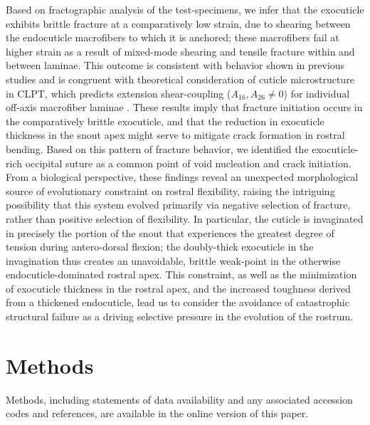 \documentclass[twocolumn, linenumbers, superscriptaddress, nofootinbib]{revtex4-1}
\begin{document}
		Based on fractographic analysis of the test-specimens, we infer that the exocuticle exhibits brittle fracture at a comparatively low strain, due to shearing between the endocuticle macrofibers to which it is anchored; these macrofibers fail at higher strain as a result of mixed-mode shearing and tensile fracture within and between laminae.
		This outcome is consistent with behavior shown in previous studies and is congruent with theoretical consideration of cuticle microstructure in CLPT, which predicts extension shear-coupling ($A_{16}, A_{26}\neq{0}$) for individual off-axis macrofiber laminae \cite{Jones2014, Reddy2004}.
		These results imply that fracture initiation occurs in the comparatively brittle exocuticle, and that the reduction in exocuticle thickness in the snout apex might serve to mitigate crack formation in rostral bending.
		Based on this pattern of fracture behavior, we identified the exocuticle-rich occipital suture as a common point of void nucleation and crack initiation.
		From a biological perspective, these findings reveal an unexpected morphological source of evolutionary constraint on rostral flexibility, raising the intriguing possibility that this system evolved primarily via negative selection of fracture, rather than positive selection of flexibility.
		In particular, the cuticle is invaginated in precisely the portion of the snout that experiences the greatest degree of tension during antero-dorsal flexion; the doubly-thick exocuticle in the invagination thus creates an unavoidable, brittle weak-point in the otherwise endocuticle-dominated rostral apex.
		This constraint, as well as the minimization of exocuticle thickness in the rostral apex, and the increased toughness derived from a thickened endocuticle, lead us to consider the avoidance of catastrophic structural failure as a driving selective pressure in the evolution of the rostrum.	
		
	\section{Methods}
		Methods, including statements of data availability and any associated accession codes and references, are available in the online version of this paper.
	
\end{document}
